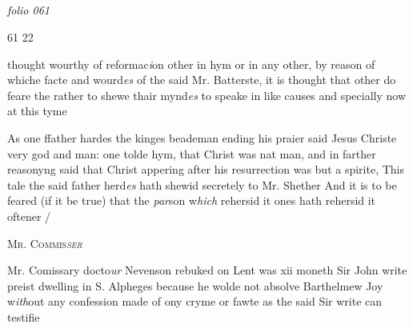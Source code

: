 \documentclass[12pt, a4paper]{book}
\begin{document}
\dotfill
						\newpage {} \subsection*{}

\textit{folio 061}
 	
 		
 			
 			
 				\begin{flushright}
 					{\color{Mahogany}61}
 					22
 				\end{flushright}
 			
 			
 				
		\ifthenelse{\isodd{\thepage}}
		{\reversemarginpar}
		{\normalmarginpar}
		thought wourthy of reformac\textit{i}on other in hym or
 in any other, by reason of whiche facte and wourd\textit{es}
 of the said Mr. Batterste, it is thought that other
 do feare the rather to shewe thair mynd\textit{es} to speake in
 like causes and specially now at this tyme
 			
 			
 				
				\marginpar[\vspace{0.5cm}{\textcolor{Gray}{herecie}}]{}
			
 				
				\marginpar[\vspace{0.5cm}{\textcolor{Gray}{n}}]{}
			
 				
		\ifthenelse{\isodd{\thepage}}
		{\reversemarginpar}
		{\normalmarginpar}
		As one ffather hardes the kinges beademan ending
 his praier said Jesus Christe very god and man:
  one tolde hym, that Christ was nat man, and in
 farther reasonyng said that Christ appering after
 his resurrection was but a spirite, This tale the said
  father herd\textit{es} hath shewid secretely to Mr. Shether
 And it is to be feared (if it be true) that the \textit{par}son
 w\textit{hich} rehersid it ones hath rehersid it oftener /
 			
 

               
               	
				\begin{center}  {\scshape Mr. Commis\textit{ser}
                  }  \end{center}
			
               	
               		
			
               		
		\ifthenelse{\isodd{\thepage}}
		{\reversemarginpar}
		{\normalmarginpar}
		Mr. Comissary docto\textit{ur} Nevenson rebuked on Lent
               			was xii moneth Sir John write preist dwelling
  in S. Alpheges because he wolde not absolve
               			Barthelmew Joy w\textit{ith}out any confession made of ony
               			cryme or fawte as the said Sir write can testifie
 
\end{document}
